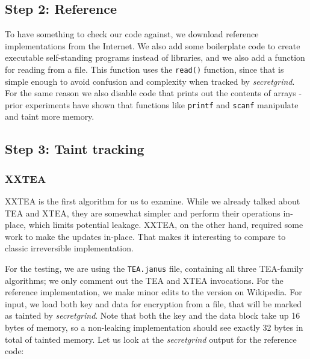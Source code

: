 \documentclass[a4paper,10pt,openright]{memoir}
\newcommand{\term}[1]{\textit{#1}}
\newcommand{\code}[1]{\texttt{#1}}
\begin{document}
\subsection{Step 2: Reference}

To have something to check our code against, we download reference 
implementations from the Internet. We also add some boilerplate code to 
create executable self-standing programs instead of libraries, and we 
also add a function for reading from a file. This function uses the 
\code{read()} function, since that is simple enough to avoid confusion 
and complexity when tracked by \term{secretgrind}. For the same reason 
we also disable code that prints out the contents of arrays - prior 
experiments have shown that functions like \code{printf} and \code{scanf} manipulate and 
taint more memory.

\subsection{Step 3: Taint tracking}

\subsubsection{XXTEA}

XXTEA is the first algorithm for us to examine. While we already talked 
about TEA and XTEA, they are somewhat simpler and perform their 
operations in-place, which limits potential leakage. XXTEA, on the 
other hand, required some work to make the updates in-place. That makes 
it interesting to compare to classic irreversible implementation.

For the testing, we are using the \code{TEA.janus} file, containing all 
three TEA-family algorithms; we only comment out the TEA and XTEA 
invocations. For the reference implementation, we make minor edits to 
the version on Wikipedia. For input, we load 
both key and data for encryption from a file, that will be marked as 
tainted by \term{secretgrind}. Note that both the key and the data 
block take up 16 bytes of memory, so a non-leaking implementation 
should see exactly 32 bytes in total of tainted memory. Let us look at 
the \term{secretgrind} output for the reference code:
\end{document}

